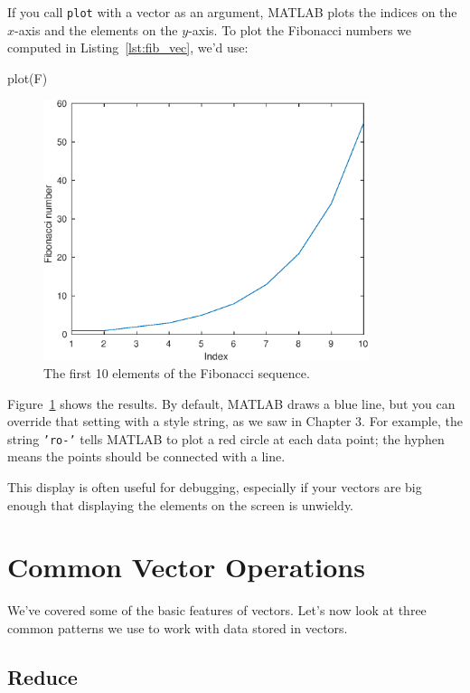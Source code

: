 If you call {\tt plot} with a vector as an argument,
MATLAB plots the indices on the $x$-axis and the elements on the
$y$-axis.
To plot the Fibonacci numbers we computed in Listing~\ref{lst:fib_vec}, we'd use:

\begin{code}
plot(F)
\end{code}

\begin{figure}
\centerline{\includegraphics[height=3in]{book/figs/fibonacci.eps}}
\caption{The first 10 elements of the Fibonacci sequence.}
\label{fig:fibonacci}
\end{figure}

Figure~\ref{fig:fibonacci} shows the results.
By default, MATLAB draws a blue line, but you can override that
setting with a style string, as we saw in Chapter 3.
For example, the string {\tt 'ro-'} tells MATLAB to plot a red circle
at each data point; the hyphen means the points should be connected
with a line.

This display is often useful for debugging, especially
if your vectors are big enough that displaying the elements on
the screen is unwieldy.




\section{Common Vector Operations}

We've covered some of the basic features of vectors. Let's now look at three common patterns we use to work with data stored in vectors.

\subsection{Reduce}
\label{reduce}

